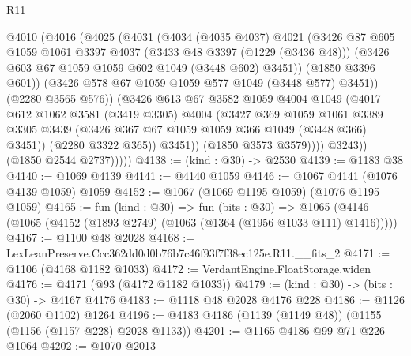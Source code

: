 \begin{lexlean}{R11}
\begin{coremodule}
                    @4010
                      (@4016
                        (@4025
                          (@4031
                            (@4034
                              (@4035 @4037)
                              @4021
                              (@3426
                                @87
                                @605
                                @1059
                                @1061
                                @3397
                                @4037
                                (@3433 @48 @3397 (@1229 (@3436 @48)))
                                (@3426 @603 @67 @1059 @1059 @602 @1049 (@3448 @602) @3451))
                              (@1850 @3396 @601))
                            (@3426 @578 @67 @1059 @1059 @577 @1049 (@3448 @577) @3451))
                          (@2280 @3565 @576))
                        (@3426
                          @613
                          @67
                          @3582
                          @1059
                          @4004
                          @1049
                          (@4017
                            @612
                            @1062
                            @3581
                            (@3419 @3305)
                            @4004
                            (@3427
                              @369
                              @1059
                              @1061
                              @3389
                              @3305
                              @3439
                              (@3426 @367 @67 @1059 @1059 @366 @1049 (@3448 @366) @3451))
                            (@2280 @3322 @365))
                          @3451))
                      (@1850 @3573 @3579))))
                @3243))
            (@1850 @2544 @2737)))))
@4138 := (kind : @30) -> @2530
@4139 := @1183 @38
@4140 := @1069 @4139
@4141 := @4140 @1059
@4146 := @1067 @4141 (@1076 @4139 @1059) @1059
@4152 := @1067 (@1069 @1195 @1059) (@1076 @1195 @1059)
@4165 := fun (kind : @30) =>
  fun (bits : @30) =>
  @1065 (@4146 (@1065 (@4152 (@1893 @2749) (@1063 (@1364 (@1956 @1033 @111) @1416)))))
@4167 := @1100 @48 @2028
@4168 := LexLeanPreserve.Ccc362dd0d0b76b7c46f93f7f38ec125e.R11.__fits_2
@4171 := @1106 (@4168 @1182 @1033)
@4172 := VerdantEngine.FloatStorage.widen
@4176 := @4171 (@93 (@4172 @1182 @1033))
@4179 := (kind : @30) -> (bits : @30) -> @4167 @4176
@4183 := @1118 @48 @2028 @4176 @228
@4186 := @1126 (@2060 @1102) @1264
@4196 := @4183 @4186 (@1139 (@1149 @48)) (@1155 (@1156 (@1157 @228) @2028 @1133))
@4201 := @1165 @4186 @99 @71 @226 @1064
@4202 := @1070 @2013

\end{coremodule}
\end{lexlean}
